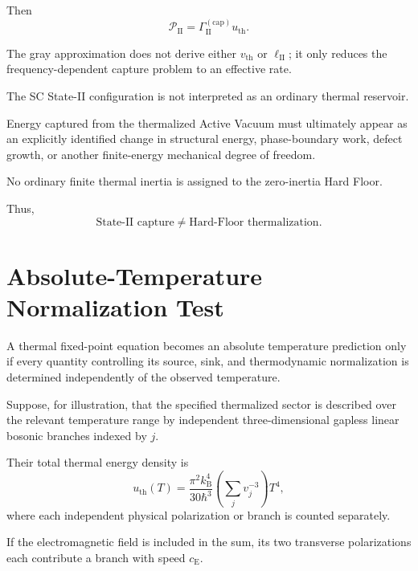 Then
\begin{equation}
    \mathcal P_{\mathrm{II}}
    =
    \Gamma_{\mathrm{II}}^{(\mathrm{cap})}
    u_{\mathrm{th}}.
    \label{eq:AT_gray_sink}
\end{equation}

The gray approximation does not derive either
\(v_{\mathrm{th}}\)
or
\(\ell_{\mathrm{II}}\);
it only reduces the frequency-dependent capture problem to an effective rate.

The SC State-II configuration is not interpreted as an ordinary thermal
reservoir.

Energy captured from the thermalized Active Vacuum must ultimately appear as
an explicitly identified change in structural energy, phase-boundary work,
defect growth, or another finite-energy mechanical degree of freedom.

No ordinary finite thermal inertia is assigned to the zero-inertia Hard
Floor.

Thus,
\begin{equation}
    \text{State-II capture}
    \neq
    \text{Hard-Floor thermalization}.
    \label{eq:AT_StateII_HardFloor_distinction}
\end{equation}

\section{Absolute-Temperature Normalization Test}

A thermal fixed-point equation becomes an absolute temperature prediction only
if every quantity controlling its source, sink, and thermodynamic
normalization is determined independently of the observed temperature.

Suppose, for illustration, that the specified thermalized sector is described
over the relevant temperature range by independent three-dimensional
gapless linear bosonic branches indexed by \(j\).

Their total thermal energy density is
\begin{equation}
    u_{\mathrm{th}}(T)
    =
    \frac{
        \pi^2k_{\mathrm B}^4
    }{
        30\hbar^3
    }
    \left(
        \sum_j
        v_j^{-3}
    \right)
    T^4,
    \label{eq:AT_total_linear_thermal_energy}
\end{equation}
where each independent physical polarization or branch is counted separately.

If the electromagnetic field is included in the sum, its two transverse
polarizations each contribute a branch with speed
\(c_{\mathrm E}\).

